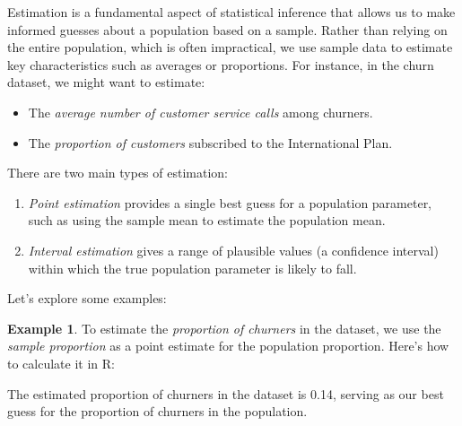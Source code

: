 \documentclass[
  11pt,
]{book}
\makeatletter
\newenvironment{Shaded}{}{}
\newcommand{\FloatTok}[1]{#1}
\newcommand{\FunctionTok}[1]{#1}
\newcommand{\NormalTok}[1]{#1}
\newcommand{\SpecialCharTok}[1]{\textcolor[rgb]{0.39,0.39,0.39}{#1}}
\newcommand{\StringTok}[1]{\textcolor[rgb]{0.39,0.39,0.39}{#1}}
\providecommand{\tightlist}{%
  \setlength{\itemsep}{0pt}\setlength{\parskip}{0pt}}
\newenvironment{kframe}{%
\medskip{}
\setlength{\fboxsep}{.8em}
 \def\at@end@of@kframe{}%
 \ifinner\ifhmode%
  \def\at@end@of@kframe{\end{minipage}}%
  \begin{minipage}{\columnwidth}%
 \fi\fi%
 \def\FrameCommand##1{\hskip\@totalleftmargin \hskip-\fboxsep
 \colorbox{shadecolor}{##1}\hskip-\fboxsep
     \hskip-\linewidth \hskip-\@totalleftmargin \hskip\columnwidth}%
 \MakeFramed {\advance\hsize-\width
   \@totalleftmargin\z@ \linewidth\hsize
   \@setminipage}}%
 {\par\unskip\endMakeFramed%
 \at@end@of@kframe}
\renewenvironment{Shaded}{\begin{kframe}}{\end{kframe}}
\theoremstyle{definition}
\theoremstyle{definition}
\newtheorem{example}{Example}[chapter]
\theoremstyle{definition}
\theoremstyle{definition}
\theoremstyle{remark}
\makeatother
\begin{document}
Estimation is a fundamental aspect of statistical inference that allows us to make informed guesses about a population based on a sample. Rather than relying on the entire population, which is often impractical, we use sample data to estimate key characteristics such as averages or proportions. For instance, in the churn dataset, we might want to estimate:

\begin{itemize}
\tightlist
\item
  The \emph{average number of customer service calls} among churners.\\
\item
  The \emph{proportion of customers} subscribed to the International Plan.
\end{itemize}

There are two main types of estimation:

\begin{enumerate}
\def\labelenumi{\arabic{enumi}.}
\tightlist
\item
  \emph{Point estimation} provides a single best guess for a population parameter, such as using the sample mean to estimate the population mean.\\
\item
  \emph{Interval estimation} gives a range of plausible values (a confidence interval) within which the true population parameter is likely to fall.
\end{enumerate}

Let's explore some examples:

\begin{example}
\protect\hypertarget{exm:ex-est-churn-proportion}{}\label{exm:ex-est-churn-proportion}To estimate the \emph{proportion of churners} in the dataset, we use the \emph{sample proportion} as a point estimate for the population proportion. Here's how to calculate it in R:

\begin{Shaded}
\end{Shaded}

The estimated proportion of churners in the dataset is 0.14, serving as our best guess for the proportion of churners in the population.
\end{example}
\end{document}
